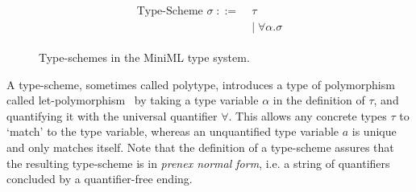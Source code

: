 \begin{figure}[!htb]
\begin{align*}
\begin{aligned}
\text{Type-Scheme } \sigma \; ::= \; &\tau \\
&| \; \forall \alpha . \sigma
\end{aligned}
\end{align*}
\caption[Type Schemes]{Type-schemes in the MiniML type system.}
\label{fig:MiniMLTypeSchemes}
\end{figure}

A type-scheme, sometimes called polytype, introduces a type of polymorphism called let-poly\-morphism~\cite{Pierce} by taking a type variable $\alpha$ in the definition of $\tau$, and quantifying it with the universal quantifier $\forall$.
This allows any concrete types $\tau$ to `match' to the type variable, whereas an unquantified type variable $a$ is unique and only matches itself.
Note that the definition of a type-scheme assures that the resulting type-scheme is in \emph{prenex normal form}, i.e. a string of quantifiers concluded by a quantifier-free ending.

